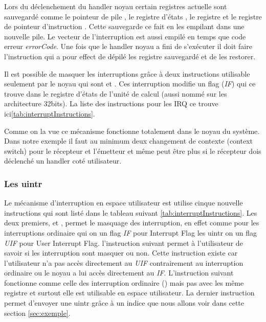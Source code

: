 Lors du déclenchement du handler noyau certain registres actuelle sont sauvegardé comme le pointeur de pile , le registre d'états , le registre  et le registre de pointeur d'instruction .
Cette sauvegarde ce fait en les empilant dans une nouvelle pile. Le vecteur de l'interruption est aussi empilé en temps que code erreur \emph{errorCode}.
Une fois que le handler noyau a fini de s'exécuter il doit faire l'instruction  qui a pour effect de dépilé les registre sauvegardé et de les restorer.

Il est possible de masquer les interruptions grâce à deux instructions utilisable seulement par le noyau qui sont  et .
Ces interruption modifie un flag (\emph{IF}) qui ce trouve dans le registre d'états de l'unité de calcul  (aussi nommé  sur les architecture 32bits).
La liste des instructions pour les IRQ ce trouve ici\ref{tab:interruptInstructions}.

Comme on la vue ce mécanisme fonctionne totalement dans le noyau du système.
Dans notre exemple il faut au minimum deux changement de contexte (context switch) pour le récepteur et l'émetteur et même peut être plus si le récepteur dois déclenché un handler coté utilisateur.


\subsubsection{Les uintr}
\label{sec:uintrDetails}

Le mécanisme d'interruption en espace utilisateur est utilise cinque nouvelle instructions qui sont listé dans le tableau suivant \ref{tab:interruptInstructions}.
Les deux premiers,  et , permet le masquage des interruption, en effet comme pour les interruptions ordinaire qui on un flag \emph{IF} pour Interrupt Flag les uintr on un flag \emph{UIF} pour User Interrupt Flag.
l'instruction suivant  permet à l'utilisateur de savoir si les interruption sont masquer ou non.
Cette instruction existe car l'utilisateur n'a pas accès directement au \emph{UIF} contrairement au interruption ordinaire ou le noyau a lui accès directement au \emph{IF}.
L'instruction suivant  fonctionne comme celle des interruption ordinaire () mais pas avec les même registre et surtout elle est utilisable en espace utilisateur.
La dernier instruction permet d'envoyer une uintr grâce à un indice que nous allons voir dans cette section \ref{sec:exemple}.

